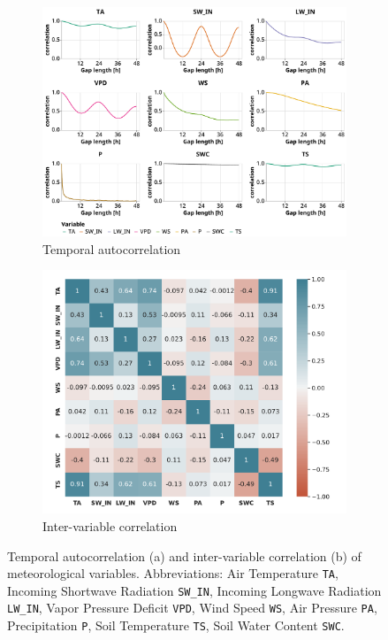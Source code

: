 \documentclass{article}
\begin{document}
\begin{figure}
\centering
\begin{subfigure}{\textwidth}
    \centering
    \includegraphics[width=4.5in]{temporal_autocorrelation}
    \caption{Temporal autocorrelation}%
    \label{fig:temp_autocorr}
\end{subfigure} 
\begin{subfigure}{\textwidth}
        \centering%
        \includegraphics[width=4in]{correlation}%
        \caption{Inter-variable correlation}%
        \label{fig:corr}%
\end{subfigure}
\caption{Temporal autocorrelation (a) and inter-variable correlation (b) of meteorological variables.  Abbreviations: Air Temperature \texttt{TA}, Incoming Shortwave Radiation \texttt{SW\_IN}, Incoming Longwave Radiation \texttt{LW\_IN}, Vapor Pressure Deficit \texttt{VPD}, Wind Speed \texttt{WS}, Air Pressure \texttt{PA}, Precipitation \texttt{P}, Soil Temperature \texttt{TS}, Soil Water Content \texttt{SWC}.}
    \label{fig:correlation}
\end{figure} 
\end{document}
